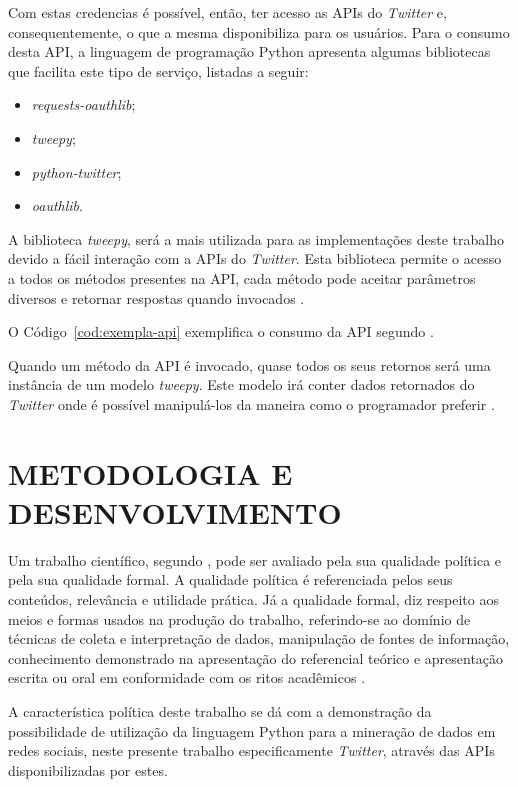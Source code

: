 Com estas credencias é possível, então, ter acesso as APIs do \textit{Twitter} e, consequentemente, o que a mesma disponibiliza para os usuários. Para o consumo desta API, a linguagem de programação Python apresenta algumas bibliotecas que facilita este tipo de serviço, listadas a seguir:

\begin{itemize}
	\item \textit{requests-oauthlib};
	\item \textit{tweepy};
	\item \textit{python-twitter};
	\item \textit{oauthlib}.
\end{itemize}

A biblioteca \textit{tweepy}, será a mais utilizada para as implementações deste trabalho devido a fácil interação com a APIs do \textit{Twitter}. Esta biblioteca permite o acesso a todos os métodos presentes na API, cada método pode aceitar parâmetros diversos e retornar respostas quando invocados \cite{tweepy}.

O Código~\ref{cod:exempla-api} exemplifica o consumo da API segundo .



Quando um método da API é invocado, quase todos os seus retornos será uma instância de um modelo \textit{tweepy}. Este modelo irá conter dados retornados do \textit{Twitter} onde é possível manipulá-los da maneira como o programador preferir \cite{tweepy}.


\section{METODOLOGIA E DESENVOLVIMENTO}\label{sec: metodologia}
Um trabalho científico, segundo , pode ser avaliado pela sua qualidade política e pela sua qualidade formal. A qualidade política é referenciada pelos seus conteúdos, relevância e utilidade prática. Já a qualidade formal, diz respeito aos meios e formas usados na produção do trabalho, referindo-se ao domínio de técnicas de coleta e interpretação de dados, manipulação de fontes de informação, conhecimento demonstrado na apresentação do referencial teórico e apresentação escrita ou oral em conformidade com os ritos acadêmicos \cite{metodologia}.

A característica política deste trabalho se dá com a demonstração da possibilidade de utilização da linguagem Python para a mineração de dados em redes sociais, neste presente trabalho especificamente \textit{Twitter}, através das APIs disponibilizadas por estes.

